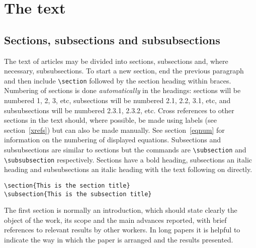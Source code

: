 \documentclass[12pt]{iopart}
\begin{document}
\section{The text}
\subsection{Sections, subsections and subsubsections}
The text of articles may be divided into sections, subsections and, where necessary, 
subsubsections. To start a new section, end the previous paragraph and 
then include \verb"\section" followed by the section heading within braces. 
Numbering of sections is done {\it automatically} in the headings: 
sections will be numbered 1, 2, 3, etc, subsections will be numbered 
2.1, 2.2,  3.1, etc, and subsubsections will be numbered 2.3.1, 2.3.2, 
etc.  Cross references to other sections in the text should, where
possible, be made using 
labels (see section~\ref{xrefs}) but can also
be made manually. See section~\ref{eqnum} for information on the numbering of displayed equations. Subsections and subsubsections are 
similar to sections but 
the commands are \verb"\subsection" and \verb"\subsubsection" respectively. 
Sections have a bold heading, subsections an italic heading and 
subsubsections an italic heading with the text following on directly.
\small\begin{verbatim}
\section{This is the section title}
\subsection{This is the subsection title}
\end{verbatim}\normalsize

The first section is normally an introduction,  which should state clearly 
the object of the work, its scope and the main advances reported, with 
brief references to relevant results by other workers. In long papers it is 
helpful to indicate the way in which the paper is arranged and the results 
presented.
\end{document}
